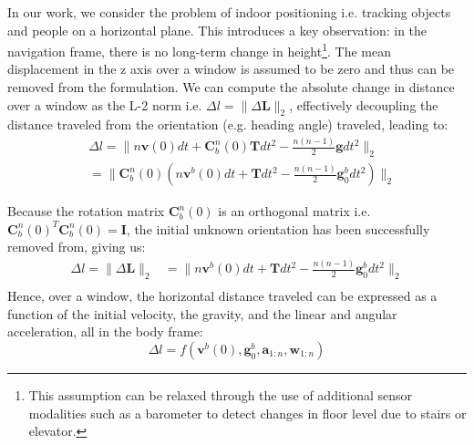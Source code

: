 \documentclass[letterpaper]{article}
\begin{document}
In our work, we consider the problem of indoor positioning i.e. tracking objects and people on a horizontal plane. This introduces a key observation: in the navigation frame, there is no long-term change in height\footnote{This assumption can be relaxed through the use of additional sensor modalities such as a barometer to detect changes in floor level due to stairs or elevator.}. %
The mean displacement in the z axis over a window is assumed to be zero and thus can be removed from the formulation. We can compute the absolute change in distance over a window as the L-2 norm i.e. $\Delta l=\|\Delta \mathbf{L} \|_2$, effectively decoupling the distance traveled from the orientation (e.g. heading angle) traveled, leading to:
	\begin{equation}
    	\begin{split}
        	&\Delta l=\| n\mathbf{v}(0)dt+ \mathbf{C}_b^n(0) \mathbf{T} dt^2-\frac{n(n-1)}{2}\mathbf{g}dt^2\|_2 \\
           &=\|\mathbf{C}_b^n(0)(n\mathbf{v}^b(0)dt+ \mathbf{T} dt^2-\frac{n(n-1)}{2}\mathbf{g}_0^b dt^2)\|_2
        \end{split}
    \end{equation}

Because the rotation matrix $\mathbf{C}_b^n(0)$ is an orthogonal matrix i.e. $\mathbf{C}_b^n(0)^T\mathbf{C}_b^n(0)=\mathbf{I}$, the initial unknown orientation has been successfully removed from, giving us: 
    \begin{equation}
    	\begin{split}
    		\Delta l =\|\Delta \mathbf{L} \|_2&=\| n\mathbf{v}^b(0)dt+ \mathbf{T} dt^2-\frac{n(n-1)}{2}\mathbf{g}_0^b dt^2\|_2 \\			
        \end{split}
    \end{equation}   
Hence, over a window, the horizontal distance traveled can be expressed as a function of the initial velocity, the gravity, and the linear and angular acceleration, all in the body frame:
	\begin{equation}
		\Delta l=f(\mathbf{v}^b(0), \mathbf{g}_0^b, \mathbf{a}_{1:n}, \mathbf{w}_{1:n})
	\end{equation}
\end{document}
